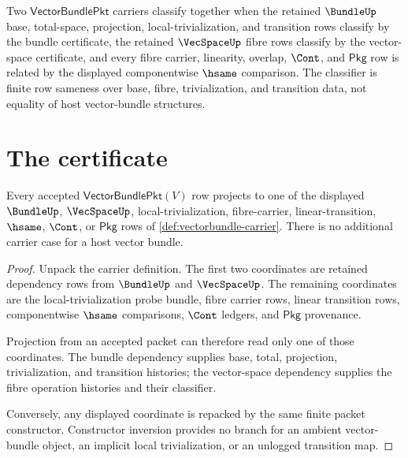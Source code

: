 \begin{definition}
\label{def:vectorbundle-classifier}
Two $\mathsf{VectorBundlePkt}$ carriers classify together when the retained
$\BundleUp$ base, total-space, projection, local-trivialization, and transition
rows classify by the bundle certificate, the retained $\VecSpaceUp$ fibre
rows classify by the vector-space certificate, and every fibre carrier,
linearity, overlap, $\Cont$, and $\mathsf{Pkg}$ row is related by the displayed
componentwise $\hsame$ comparison. The classifier is finite row sameness over
base, fibre, trivialization, and transition data, not equality of host
vector-bundle structures.
\end{definition}

\section{The certificate}
\label{sec:vectorbundle-certificate}

\begin{theorem}
\label{thm:vectorbundle-carrier-obligation}
Every accepted $\mathsf{VectorBundlePkt}(V)$ row projects to one of the
displayed $\BundleUp$, $\VecSpaceUp$, local-trivialization, fibre-carrier,
linear-transition, $\hsame$, $\Cont$, or $\mathsf{Pkg}$ rows of
\autoref{def:vectorbundle-carrier}. There is no additional carrier case for a
host vector bundle.
\end{theorem}
\begin{proof}
Unpack the carrier definition. The first two coordinates are retained
dependency rows from $\BundleUp$ and $\VecSpaceUp$. The remaining coordinates
are the local-trivialization probe bundle, fibre carrier rows, linear
transition rows, componentwise $\hsame$ comparisons, $\Cont$ ledgers, and
$\mathsf{Pkg}$ provenance.

Projection from an accepted packet can therefore read only one of those
coordinates. The bundle dependency supplies base, total, projection,
trivialization, and transition histories; the vector-space dependency supplies
the fibre operation histories and their classifier.

Conversely, any displayed coordinate is repacked by the same finite packet
constructor. Constructor inversion provides no branch for an ambient
vector-bundle object, an implicit local trivialization, or an unlogged
transition map.
\end{proof}

